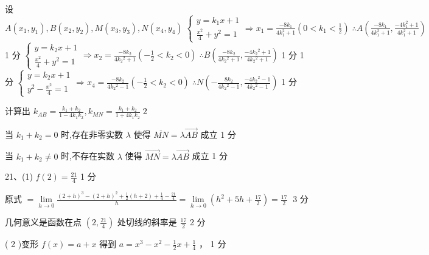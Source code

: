 \documentclass[10pt]{article}
\begin{document}
设 \(A\left( {{x}_{1},{y}_{1}}\right) ,B\left( {{x}_{2},{y}_{2}}\right) ,M\left( {{x}_{3},{y}_{3}}\right) ,N\left( {{x}_{4},{y}_{4}}\right) \; \left\{  {\begin{array}{l} y = {k}_{1}x + 1 \\  \frac{{x}^{2}}{4} + {y}^{2} = 1 \end{array} \Rightarrow  {x}_{1} = \frac{-8{k}_{1}}{4{k}_{1}^{2} + 1}\left( {0 < {k}_{1} < \frac{1}{2}}\right) \;\therefore A\left( {\frac{-8{k}_{1}}{4{k}_{1}^{2} + 1},\frac{-4{k}_{1}^{2} + 1}{4{k}_{1}^{2} + 1}}\right) }\right.\) 1 分 \(\left\{  {\begin{array}{l} y = {k}_{2}x + 1 \\  \frac{{x}^{2}}{4} + {y}^{2} = 1 \end{array} \Rightarrow  {x}_{2} = \frac{-8{k}_{2}}{4{k}_{2}{}^{2} + 1}\left( {-\frac{1}{2} < {k}_{2} < 0}\right) }\right. \;\therefore B\left( {\frac{-8{k}_{2}}{4{k}_{2}{}^{2} + 1},\frac{-4{k}_{2}{}^{2} + 1}{4{k}_{2}{}^{2} + 1}}\right)\) 1 分 1 分 \(\left\{  {\begin{array}{l} y = {k}_{2}x + 1 \\  {y}^{2} - \frac{{x}^{2}}{4} = 1 \end{array} \Rightarrow  {x}_{4} = \frac{-8{k}_{2}}{4{k}_{2}{}^{2} - 1}\left( {-\frac{1}{2} < {k}_{2} < 0}\right) \;\therefore N\left( {-\frac{8{k}_{2}}{4{k}_{2}{}^{2} - 1},\frac{-4{k}_{2}{}^{2} - 1}{4{k}_{2}{}^{2} - 1}}\right) }\right.\) 1 分

计算出 \({k}_{AB} = \frac{{k}_{1} + {k}_{2}}{1 - 4{k}_{1}{k}_{2}},{k}_{MN} = \frac{{k}_{1} + {k}_{2}}{1 + 4{k}_{1}{k}_{2}}\;2\)

当 \({k}_{1} + {k}_{2} = 0\) 时,存在非零实数 \(\lambda\) 使得 \(\overline{MN} = \lambda \overrightarrow{AB}\) 成立 1 分

当 \({k}_{1} + {k}_{2} \neq  0\) 时,不存在实数 \(\lambda\) 使得 \(\overrightarrow{MN} = \lambda \overrightarrow{AB}\) 成立 1 分

21、(1) \(f\left( 2\right)  = \frac{21}{4}\) 1 分

原式 \(= \mathop{\lim }\limits_{{h \rightarrow  0}}\frac{{\left( 2 + h\right) }^{3} - {\left( 2 + h\right) }^{2} + \frac{1}{2}\left( {h + 2}\right)  + \frac{1}{4} - \frac{21}{4}}{h} = \mathop{\lim }\limits_{{h \rightarrow  0}}\left( {{h}^{2} + {5h} + \frac{17}{2}}\right)  = \frac{17}{2}\;\) 3 分

几何意义是函数在点 \(\left( {2,\frac{21}{4}}\right)\) 处切线的斜率是 \(\frac{17}{2}\) 2 分

( 2 )变形 \(f\left( x\right)  = a + x\) 得到 \(a = {x}^{3} - {x}^{2} - \frac{1}{2}x + \frac{1}{4}\) ， 1 分
\end{document}
